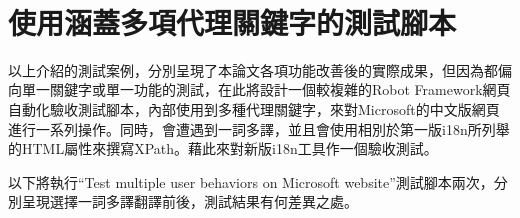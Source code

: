 \hspace*{\fill} \\
\\ \hspace*{\fill} \\
\\ \hspace*{\fill} \\
\\ \hspace*{\fill} \\
\\ \hspace*{\fill} \\
\\ \hspace*{\fill} \\
\\ \hspace*{\fill} \\
\section{使用涵蓋多項代理關鍵字的測試腳本}
以上介紹的測試案例，分別呈現了本論文各項功能改善後的實際成果，但因為都偏向單一關鍵字或單一功能的測試，在此將設計一個較複雜的Robot Framework網頁自動化驗收測試腳本，內部使用到多種代理關鍵字，來對Microsoft的中文版網頁進行一系列操作。同時，會遭遇到一詞多譯，並且會使用相別於第一版i18n所列舉的HTML屬性來撰寫XPath。藉此來對新版i18n工具作一個驗收測試。

以下將執行“Test multiple user behaviors on Microsoft website”測試腳本兩次，分別呈現選擇一詞多譯翻譯前後，測試結果有何差異之處。
\hspace*{\fill} \\
\\ \hspace*{\fill} \\
\\ \hspace*{\fill} \\
\\ \hspace*{\fill} \\
\\ \hspace*{\fill} \\
\\ \hspace*{\fill} \\
\\ \hspace*{\fill} \\
\\ \hspace*{\fill} \\

